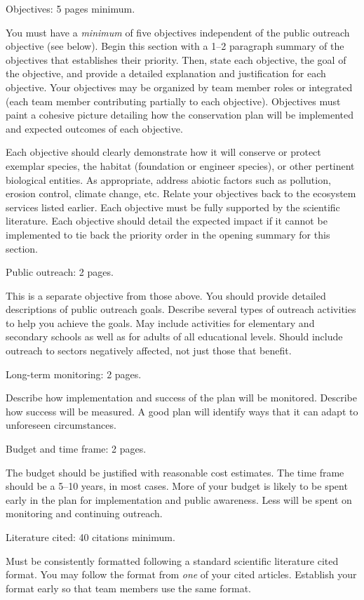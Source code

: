 \documentclass[12pt, hidelinks, addpoints]{exam}
\begin{document}
\begin{questions}
\question[50]
Objectives: 5 pages minimum.

	You must have a \emph{minimum} of five objectives independent of the public outreach objective (see below). Begin this section with a 1--2 paragraph summary of the objectives that establishes their priority. Then, state each objective, the  goal of the objective, and provide a detailed explanation and justification for each objective. Your objectives may be organized by team member roles or integrated (each team member contributing partially to each objective). Objectives must paint a cohesive picture detailing how the conservation plan will be implemented and expected outcomes of each objective.

Each objective should clearly demonstrate how it will conserve or protect exemplar species, the habitat (foundation or engineer species), or other pertinent biological entities. As appropriate, address abiotic factors such as pollution, erosion control, climate change, etc. Relate your objectives back to the ecosystem services listed earlier. Each objective must be fully supported by the scientific literature. Each objective should detail the expected impact if it cannot be implemented to tie back the priority order in the opening summary for this section.


\question[20]
Public outreach: 2 pages.

	This is a separate objective from those above. You should provide detailed descriptions of public outreach goals. Describe several types of outreach activities to help you achieve the goals. May include activities for elementary and secondary schools as well as for adults of all educational levels. Should include outreach to sectors negatively affected, not just those that benefit. 
	
\question[20]
Long-term monitoring: 2 pages.

	Describe how implementation and success of the plan will be monitored. Describe how success will be measured. A good plan will identify ways that it can adapt to unforeseen circumstances.

\question[10]
Budget and time frame: 2 pages.

The budget should be justified with reasonable cost estimates. The time frame should be a 5–10 years, in most cases. More of your budget is likely to be spent early in the plan for implementation and public awareness. Less will be spent on monitoring and continuing outreach.

\question[10]
Literature cited: 40 citations minimum.

Must be consistently formatted following a standard scientific literature cited format. You may follow the format from \emph{one} of your cited articles. Establish your format early so that team members use the same format. 

\end{questions}
\end{document}
